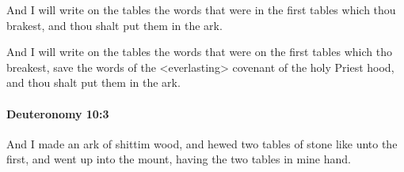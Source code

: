 			And I will write on the tables the words that were in the first tables which thou brakest, and thou shalt put them in the ark.

			\begin{framed}
			\scriptsize
				\begin{compactdesc}
					\item[OTR2] And I will write on the tables the words that were on the first tables which tho breakest, save the words of the <everlasting> covenant of the holy Priest hood, and thou shalt put them in the ark.
				\end{compactdesc}
			\end{framed}

		\paragraph{Deuteronomy 10:3} %
			\label{DEUTERONOMY-10-3}

			And I made an ark of shittim wood, and hewed two tables of stone like unto the first, and went up into the mount, having the two tables in mine hand.

